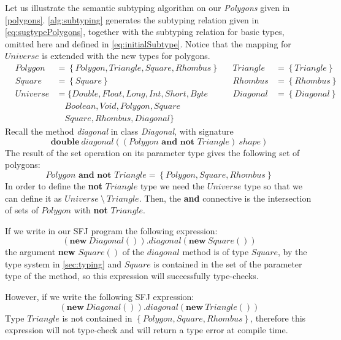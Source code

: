 \documentclass[runningheads]{llncs}
\begin{document}
Let us illustrate the semantic subtyping algorithm on our \emph{Polygons} given in \autoref{polygons}.
\autoref{alg:subtyping} generates the subtyping relation given in \autoref{eq:sugtypePolygons}, together with the subtyping relation for basic types, omitted here and defined in \autoref{eq:initialSubtype}. Notice that the mapping for $Universe$ is extended with the new types for polygons.
\begin{equation}
    \label{eq:sugtypePolygons}
    \begin{array}{llllll}
         & Polygon  & = \left\{Polygon, Triangle, Square, Rhombus \right\} &  & Triangle & = \left\{Triangle\right\}           \\
         & Square   & = \left\{Square\right\}                              &  & Rhombus  & = \left\{Rhombus\right\}            \\
         & Universe & = \{Double, Float, Long, Int, Short, Byte                                                              &  & Diagonal & = \left\{Diagonal\right\}          \\
         &          & \quad Boolean, Void, Polygon, Square                                                                     \\
         &          & \quad Square, Rhombus, Diagonal\}
    \end{array}
\end{equation}
Recall the method \emph{diagonal} in class \emph{Diagonal}, with signature
$$
\mathbf{double}\ diagonal((\textit{Polygon} \textbf{ and not }  \textit{Triangle}) \ shape)
$$
The result of the set operation on its parameter type gives the following set of polygons:
$$
Polygon \textbf{ and not } Triangle = \left\{Polygon, Square, Rhombus \right\}
$$
In order to define the \textbf{not} $Triangle$ type we need the $Universe$ type so that we can define it as $Universe\ \mathbf{\setminus}\ Triangle$. Then, the \textbf{and} connective is the intersection of sets of $Polygon$ with \textbf{not} $Triangle$.

If we write in our SFJ program the following expression:
$$
    (\textbf{new}\ Diagonal()).diagonal(\textbf{new}\ Square())
$$
the argument \textbf{new} $Square()$ of the $diagonal$ method is of type $Square$, by the type system in \autoref{sec:typing} and $Square$ is contained in the set of the parameter type of the method, so this expression will successfully type-checks.

However, if we write the following SFJ expression:
$$
    (\textbf{new}\ Diagonal()).diagonal(\textbf{new}\ Triangle())
$$
Type $Triangle$ is not contained in $\left\{Polygon, Square, Rhombus \right\}$, therefore this expression will not type-check and will return a type error at compile time.
\end{document}
